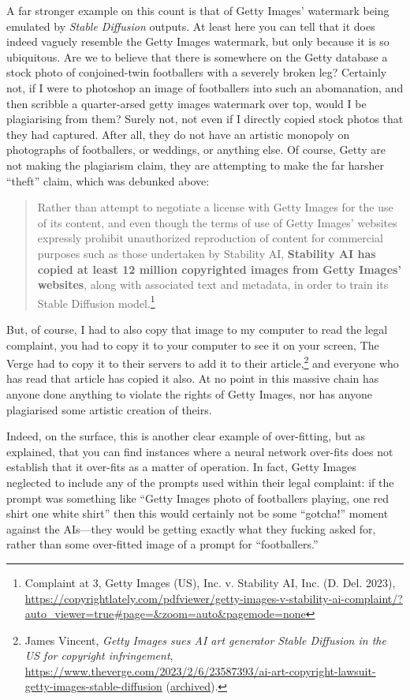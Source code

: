 \documentclass[11pt]{article}
\begin{document}
A far stronger example on this count is that of Getty Images' watermark being emulated by \emph{Stable Diffusion} outputs. At least here you can tell that it does indeed vaguely resemble the Getty Images watermark, but only because it is so ubiquitous. Are we to believe that there is somewhere on the Getty database a stock photo of conjoined-twin footballers with a severely broken leg? Certainly not, if I were to photoshop an image of footballers into such an abomanation, and then scribble a quarter-arsed getty images watermark over top, would I be plagiarising from them? Surely not, not even if I directly copied stock photos that they had captured. After all, they do not have an artistic monopoly on photographs of footballers, or weddings, or anything else. Of course, Getty are not making the plagiarism claim, they are attempting to make the far harsher ``theft'' claim, which was debunked above:
\begin{quote}
Rather than attempt to negotiate a license with Getty Images for the use of its content, and even though the terms of use of Getty Images’ websites expressly prohibit unauthorized reproduction of content for commercial purposes such as those undertaken by Stability AI, \textbf{Stability AI has copied at least 12 million copyrighted images from Getty Images’ websites}, along with associated text and metadata, in order to train its Stable Diffusion model.\footnote{Complaint at 3, Getty Images (US), Inc. v. Stability AI, Inc. (D. Del. 2023), \url{https://copyrightlately.com/pdfviewer/getty-images-v-stability-ai-complaint/?auto\_viewer=true\#page=\&zoom=auto\&pagemode=none}}
\end{quote}

But, of course, I had to also copy that image to my computer to read the legal complaint, you had to copy it to your computer to see it on your screen, The Verge had to copy it to their servers to add it to their article,\footnote{James Vincent, \emph{Getty Images sues AI art generator Stable Diffusion in the US for copyright infringement}, \url{https://www.theverge.com/2023/2/6/23587393/ai-art-copyright-lawsuit-getty-images-stable-diffusion} (\href{https://archive.ph/zNwP7}{archived}).} and everyone who has read that article has copied it also. At no point in this massive chain has anyone done anything to violate the rights of Getty Images, nor has anyone plagiarised some artistic creation of theirs.

Indeed, on the surface, this is another clear example of over-fitting, but as explained, that you can find instances where a neural network over-fits does not establish that it over-fits as a matter of operation. In fact, Getty Images neglected to include any of the prompts used within their legal complaint: if the prompt was something like ``Getty Images photo of footballers playing, one red shirt one white shirt'' then this would certainly not be some ``gotcha!'' moment against the AIs---they would be getting exactly what they fucking asked for, rather than some over-fitted image of a prompt for ``footballers.''
\end{document}
